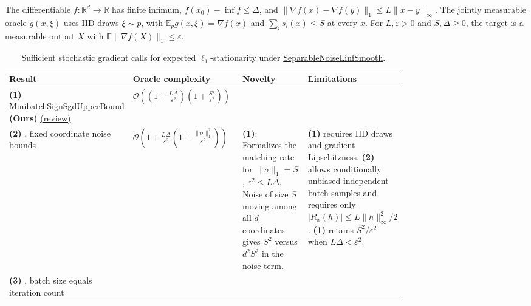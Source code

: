 \begin{table}[tp]
\centering
\caption{Sufficient stochastic gradient calls for expected $\ell_1$-stationarity under \href{https://github.com/k3nfalt/longtails/blob/main/LongTails/Setups/SeparableNoiseLinfSmooth.lean}{SeparableNoiseLinfSmooth}.}\label{tab:SeparableNoiseLinfSmooth}
\parbox{\linewidth}{\footnotesize The differentiable $f:\mathbb R^d\to\mathbb R$ has finite infimum, $f(x_0)-\inf f\le\Delta$, and $\|\nabla f(x)-\nabla f(y)\|_1\le L\|x-y\|_\infty$. The jointly measurable oracle $g(x,\xi)$ uses IID draws $\xi\sim p$, with $\mathbb E_p g(x,\xi)=\nabla f(x)$ and $\sum_i s_i(x)\le S$ at every $x$. For $L,\varepsilon>0$ and $S,\Delta\ge0$, the target is a measurable output $X$ with $\mathbb E\|\nabla f(X)\|_1\le\varepsilon$.}\par\smallskip
\begin{threeparttable}
\footnotesize
\setlength{\tabcolsep}{4pt}\renewcommand{\arraystretch}{1.25}
\begin{tabularx}{\linewidth}{@{}>{\raggedright\arraybackslash}p{0.20\linewidth}>{\raggedright\arraybackslash}p{0.30\linewidth}>{\raggedright\arraybackslash}p{0.26\linewidth}>{\raggedright\arraybackslash}X@{}}
\toprule
\textbf{Result} & \textbf{Oracle complexity} & \textbf{Novelty} & \textbf{Limitations} \\
\midrule
\textbf{(1)} \href{https://github.com/k3nfalt/longtails/blob/main/LongTails/Theorems/MinibatchSignSgdUpperBound.lean}{Minibatch\allowbreak Sign\allowbreak Sgd\allowbreak Upper\allowbreak Bound} \textbf{(Ours)} \href{https://github.com/k3nfalt/longtails/blob/main/scripts/reviews/MinibatchSignSgdUpperBound.md}{(review)}
& $\mathcal{O}\!\left(\left(1+\frac{L\Delta}{\varepsilon^2}\right)\!\left(1+\frac{S^2}{\varepsilon^2}\right)\right)$ & & \\
\midrule[1.2pt]
\textbf{(2)} \citep[Thm.~1]{bssTaoYuZhang2026v1}, fixed coordinate noise bounds
& $\mathcal{O}\!\left(1+\frac{L\Delta}{\varepsilon^2}\left(1+\frac{\|\sigma\|_1^2}{\varepsilon^2}\right)\right)$
& \textbf{(1)}: Formalizes the matching rate for $\|\sigma\|_1=S$, $\varepsilon^2\le L\Delta$. Noise of size $S$ moving among all $d$ coordinates gives $S^2$ versus $d^2 S^2$ in the noise term.
& \textbf{(1)} requires IID draws and gradient Lipschitzness. \textbf{(2)} allows conditionally unbiased independent batch samples and requires only $|R_x(h)|\le L\|h\|_\infty^2/2$. \textbf{(1)} retains $S^2/\varepsilon^2$ when $L\Delta<\varepsilon^2$. \\
\midrule
\textbf{(3)} \citep[Thm.~1]{pmlr-v80-bernstein18a}, batch size equals iteration count

\end{tabularx}
\end{threeparttable}
\end{table}
